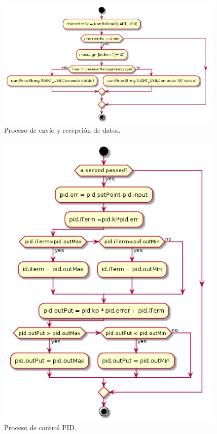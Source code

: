 	\begin{figure}[htpb]
	\centering
	\includegraphics[scale=.60]{./Figures/Porcesorecepcionyenviodedatos.png}
	\caption{Proceso de envío y recepción de datos.}
	\label{fig:Proceso De envió y recepción de datos}
	\end{figure}

	
\begin{figure}[htpb]
	\centering
	\includegraphics[scale=.60]{./Figures/procesocontrolPID.png}
	\caption{Proceso de control PID.}
	\label{fig:Proceso de Control PID}
	\end{figure}
	
